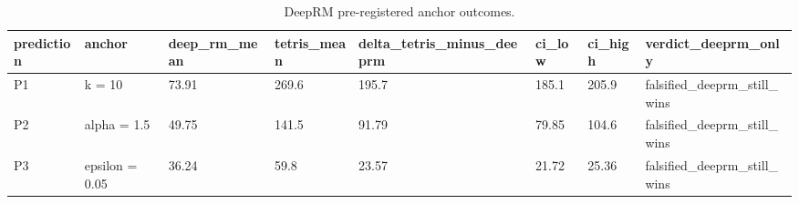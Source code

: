 \begin{table}[t]
\centering
\caption{DeepRM pre-registered anchor outcomes.}
\begin{tabular}{llllllll}
\hline
prediction & anchor & deep\_rm\_mean & tetris\_mean & delta\_tetris\_minus\_deeprm & ci\_low & ci\_high & verdict\_deeprm\_only \\
\hline
P1 & k = 10 & 73.91 & 269.6 & 195.7 & 185.1 & 205.9 & falsified\_deeprm\_still\_wins \\
P2 & alpha = 1.5 & 49.75 & 141.5 & 91.79 & 79.85 & 104.6 & falsified\_deeprm\_still\_wins \\
P3 & epsilon = 0.05 & 36.24 & 59.8 & 23.57 & 21.72 & 25.36 & falsified\_deeprm\_still\_wins \\
\hline
\end{tabular}
\end{table}
